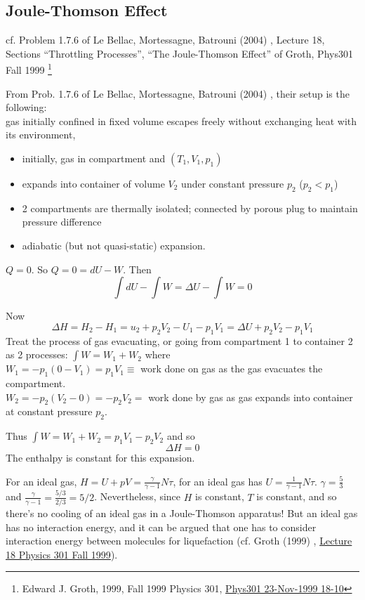 \documentclass[10pt]{amsart}
\begin{document}
\begin{multicols*}{2}
\section{Joule-Thomson Effect}

cf. Problem 1.7.6 of Le Bellac, Mortessagne, Batrouni (2004) \cite{MLeBellacFMortessagneGBatrouni2004}, Lecture 18, Sections ``Throttling Processes'', ``The Joule-Thomson Effect'' of Groth, Phys301 Fall 1999 \footnote{Edward J. Groth, 1999, Fall 1999 Physics 301, \href{http://grothserver.princeton.edu/~groth/phys301f99/lect18.pdf}{Phys301 23-Nov-1999 18-10} }

From Prob. 1.7.6 of Le Bellac, Mortessagne, Batrouni (2004) \cite{MLeBellacFMortessagneGBatrouni2004}, their setup is the following: \\
gas initially confined in fixed volume escapes freely without exchanging heat with its environment, 
\begin{itemize}
\item initially, gas in compartment and $(T_1,V_1,p_1)$ 
\item expands into container of volume $V_2$ under constant pressure $p_2$ ($p_2<p_1$)
\item 2 compartments are thermally isolated; connected by porous plug to maintain pressure difference
\item adiabatic (but not quasi-static) expansion.
\end{itemize}

$Q=0$.  So $Q=0 = dU -W$.  Then
\[
\int dU - \int W = \Delta U - \int W = 0 
\]

Now
\[
\Delta H = H_2 - H_1 = u_2 + p_2 V_2 - U_1 - p_1 V_1 = \Delta U + p_2 V_2 - p_1 V_1 
\]
Treat the process of gas evacuating, or going from compartment 1 to container 2 as 2 processes:  $\int W = W_1 + W_2$ where \\
$W_1 = -p_1 (0-V_1) = p_1 V_1 \equiv $ work done on gas as the gas evacuates the compartment. \\
$W_2 = -p_2(V_2-0) = -p_2 V_2 = $ work done by gas as gas expands into container at constant pressure $p_2$.  

Thus $\int W = W_1 + W_2 = p_1 V_1 - p_2 V_2$ and so 
\[
\boxed{ \Delta H = 0 }
\]
The enthalpy is constant for this expansion.  

For an ideal gas, $H= U + pV = \frac{\gamma}{\gamma -1} N\tau$, for an ideal gas has $U = \frac{1}{\gamma -1} N\tau$.  $\gamma = \frac{5}{3}$ and $\frac{\gamma}{\gamma-1} = \frac{5/3}{ 2/3} = 5/2$.  Nevertheless, since $H$ is constant, $T$ is constant, and so there's no cooling of an ideal gas in a Joule-Thomson apparatus!  But an ideal gas has no interaction energy, and it can be argued that one has to consider interaction energy between molecules for liquefaction (cf. Groth (1999) \cite{EGroth1999}, \href{http://grothserver.princeton.edu/~groth/phys301f99/lect18.pdf}{Lecture 18 Physics 301 Fall 1999}).  


\end{multicols*}
\end{document}
